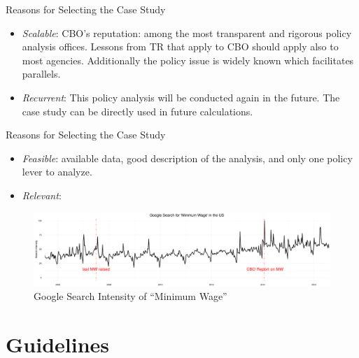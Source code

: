\documentclass{beamer}
\begin{document}
\begin{frame}[label = reas_cs]{Reasons for Selecting the Case Study}
\vspace*{1em}
\begin{itemize}
\item \textit{Scalable}: CBO's reputation: among the most transparent and rigorous policy analysis offices. Lessons from TR that apply to CBO should apply also to most agencies.  Additionally the policy issue is widely known which facilitates parallels. 
\item \textit{Recurrent}: This policy analysis will be conducted again in the future. The case study can be directly used in future calculations. 
\end{itemize}

\end{frame}

\begin{frame}{Reasons for Selecting the Case Study}

\begin{itemize}
\item \textit{Feasible}: available data, good description of the analysis, and only one policy lever to analyze. 
\item \textit{Relevant}: 
\end{itemize}

\begin{figure}[h!]
\centering
\vspace*{-1em}
\hspace*{-1.7em}
\includegraphics[scale = 0.22]{../Images/min_wage_gtrend}
\vspace*{-0.8em}
\caption{Google Search Intensity of ``Minimum Wage''}
\label{mw_gtrend}
\end{figure}	

\end{frame}

\section{Guidelines}
\end{document}

